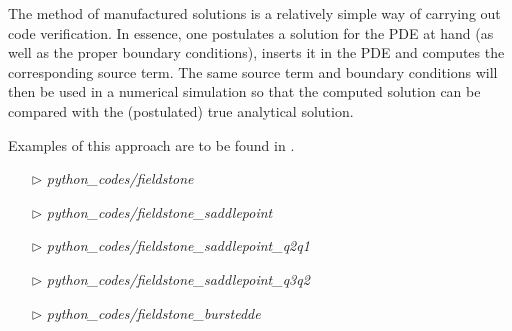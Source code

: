  

The method of manufactured solutions is a relatively simple way of carrying out
code verification. In essence, one postulates a solution for the PDE at hand (as
well as the proper boundary conditions), inserts it in the PDE and computes the 
corresponding source term. 
The same source term and boundary conditions will then be used in a numerical 
simulation so that the computed solution can be compared with the (postulated)
true analytical solution. 

Examples of this approach are to be found in \cite{dohu,busa13,dodg06}.


\begin{mdframed}[backgroundcolor=green!5]
\begin{itemize}
\item[$\triangleright$] {\sl python\_codes/fieldstone}
\item[$\triangleright$] {\sl python\_codes/fieldstone\_saddlepoint}
\item[$\triangleright$] {\sl python\_codes/fieldstone\_saddlepoint\_q2q1}
\item[$\triangleright$] {\sl python\_codes/fieldstone\_saddlepoint\_q3q2}
\item[$\triangleright$] {\sl python\_codes/fieldstone\_burstedde}
\end{itemize}
\end{mdframed}




